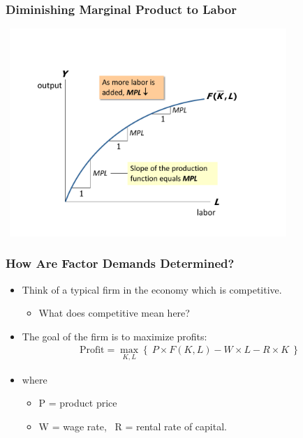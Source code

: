 \documentclass[handout]{beamer}
\begin{document}

\begin{frame}[t]
\frametitle{Diminishing Marginal Product to Labor}
\begin{center}
\includegraphics[height=3.1in,width=4.25in]{../Figures/mpl_labor.pdf}
\end{center}
\end{frame}



\begin{frame}[t]
\frametitle{How Are Factor Demands Determined?}
\begin{itemize}
\item Think of a typical firm in the economy which is competitive.
\begin{itemize}
\medskip
\item What does competitive mean here?
\end{itemize}
\bigskip
\item The goal of the firm is to maximize profits:
\begin{eqnarray*}
\mbox{Profit} = \max_{K,L} \left\{ \ P \times F(K,L) - W \times L - R \times K \ \right\}
\end{eqnarray*}
\item where
\begin{itemize}
\medskip
\item P = product price
\medskip
\item W = wage rate, \ R = rental rate of capital.
\end{itemize}
\end{itemize}
\end{frame}
\end{document}
